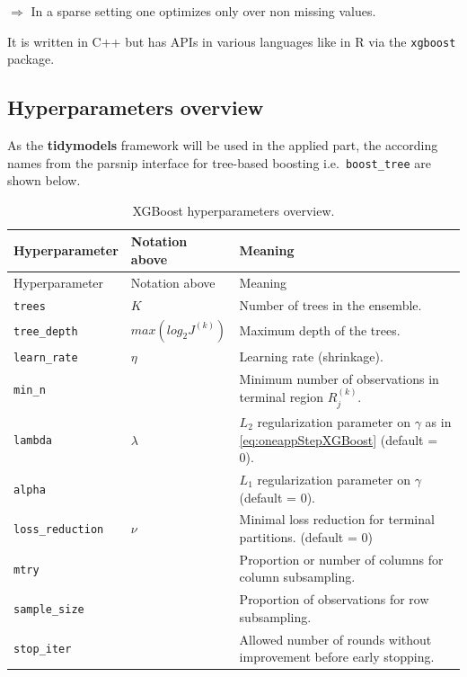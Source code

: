 \documentclass[
]{book}
\begin{document}
\(\Rightarrow\) In a sparse setting one optimizes only over non missing values.

It is written in C++ but has APIs in various languages like in R via the \texttt{xgboost} package.\citep{xgboost_package}

\hypertarget{hyperparameters-overview}{%
\subsection{Hyperparameters overview}\label{hyperparameters-overview}}

As the \textbf{tidymodels} framework will be used in the applied part, the according names from the parsnip interface for tree-based boosting i.e.~\texttt{boost\_tree} are shown below.\citep[\citet{xgboost_package}, \citet{tidymodels}]{xgboostPaper}

\begin{longtable}[]{@{}
  >{\raggedright\arraybackslash}p{}
  >{\raggedright\arraybackslash}p{}
  >{\raggedright\arraybackslash}p{}@{}}
\caption{\label{tab:xgboostHyper} XGBoost hyperparameters overview.}\tabularnewline
\toprule
Hyperparameter & Notation above & Meaning \\
\midrule
\endfirsthead
\toprule
Hyperparameter & Notation above & Meaning \\
\midrule
\endhead
\texttt{trees} & \(K\) & Number of trees in the ensemble. \\
\texttt{tree\_depth} & \(max(log_2J^{(k)})\) & Maximum depth of the trees. \\
\texttt{learn\_rate} & \(\eta\) & Learning rate (shrinkage). \\
\texttt{min\_n} & & Minimum number of observations in terminal region \(R^{(k)}_j\). \\
\texttt{lambda} & \(\lambda\) & \(L_2\) regularization parameter on \(\gamma\) as in \eqref{eq:oneappStepXGBoost} (default = 0). \\
\texttt{alpha} & & \(L_1\) regularization parameter on \(\gamma\) (default = 0). \\
\texttt{loss\_reduction} & \(\nu\) & Minimal loss reduction for terminal partitions. (default = 0) \\
\texttt{mtry} & & Proportion or number of columns for column subsampling. \\
\texttt{sample\_size} & & Proportion of observations for row subsampling. \\
\texttt{stop\_iter} & & Allowed number of rounds without improvement before early stopping. \\
\bottomrule
\end{longtable}
\end{document}
